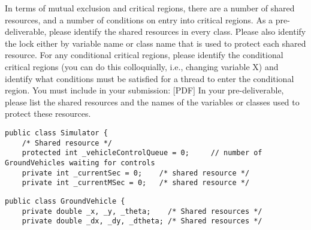 \documentclass[12pt]{article}
\begin{document}
	
In terms of mutual exclusion and critical regions, there are a number of shared resources, and a number of conditions on entry into critical regions. As a pre-deliverable, please identify the shared resources in every class. Please also identify the lock either by variable name or class name that is used to protect each shared resource.
For any conditional critical regions, please identify the conditional critical regions (you can do this colloquially, i.e., changing variable X) and identify what conditions must be satisfied for a thread to enter the conditional region.
You must include in your submission:
 $[$PDF$]$ In your pre-deliverable, please list the shared resources and the names of the variables or classes used to protect these resources.\qe

\begin{lstlisting}
public class Simulator {
    /* Shared resource */
    protected int _vehicleControlQueue = 0;     // number of GroundVehicles waiting for controls
    private int _currentSec = 0;    /* shared resource */
    private int _currentMSec = 0;   /* shared resource */
\end{lstlisting}

\begin{lstlisting}
public class GroundVehicle {
	private double _x, _y, _theta;    /* Shared resources */
	private double _dx, _dy, _dtheta; /* Shared resources */
\end{lstlisting}
\end{document}
